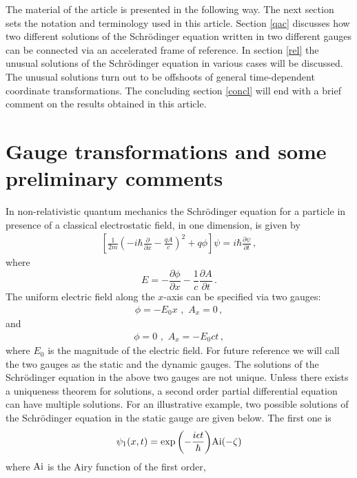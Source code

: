 \documentclass[12pt]{article}
\begin{document}
The material of the article is presented in the following way. The next
section sets the notation and terminology used in this article.  Section
\ref{qac} discusses how two different solutions of the Schr\"{o}dinger
equation written in two different gauges can be connected via an accelerated
frame of reference. In section \ref{rel} the unusual solutions of the 
Schr\"{o}dinger equation in various cases will be discussed. The
unusual solutions turn out to be offshoots of general time-dependent
coordinate transformations. The concluding section \ref{concl} will end with a
brief comment on the results obtained in this article.
\section{Gauge  transformations and some preliminary comments}
In non-relativistic quantum mechanics the Schr\"{o}dinger equation for
a particle in presence of a classical electrostatic field, in one
dimension, is given by
%
\begin{eqnarray}
\left[\frac{1}{2m}\left(-i\hbar\frac{\partial}{\partial x}-
\frac{q A}{c}\right)^2 + q\phi\right]\psi=i\hbar\frac{\partial
\psi}{\partial t}\,,
\label{sch}
\end{eqnarray}
%
where 
$$E=-\frac{\partial \phi}{\partial x} - 
\frac1c\frac{\partial A}{\partial t}\,.$$ The uniform electric field
along the $x$-axis can be specified via two gauges:
%
\begin{eqnarray}
\phi = -E_0 x\,\,,\,\,A_x=0\,,
\label{g1}
\end{eqnarray}
%
and
%
\begin{eqnarray}
\phi = 0\,\,,\,\,A_x=- E_0 c t\,,
\label{g2}
\end{eqnarray}
%
where $E_0$ is the magnitude of the electric field. For future
reference we will call the two gauges as the static and the dynamic
gauges. The solutions of the Schr\"{o}dinger equation in the above two
gauges are not unique. Unless there exists a uniqueness theorem for
solutions, a second order partial differential equation can have
multiple solutions. For an illustrative example, two possible
solutions of the Schr\"{o}dinger equation in the static gauge are
given below. The first one is \cite{landau}
%
\begin{eqnarray}
\psi_1(x,t) = \exp{\left(-\frac{i\epsilon t}{\hbar}\right)}
{\rm Ai(-\zeta)}
\label{stata}
\end{eqnarray} 
%
where ${\rm Ai}$ is the Airy function of the first order,
\end{document}
